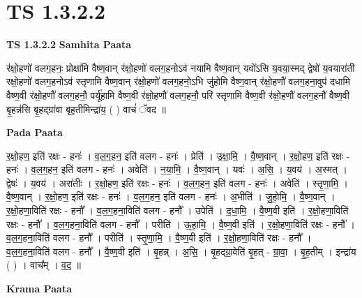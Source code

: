 \documentclass[17pt]{extarticle}
\begin{document}
\section{ TS 1.3.2.2 }

\textbf{TS 1.3.2.2 } \newline
\textbf{Samhita Paata} \newline

र॑क्षो॒हणो॑ वलग॒हनः॒ प्रोक्षा॑मि वैष्ण॒वान् र॑क्षो॒हणो॑ वलग॒हनोऽव॑ नयामि वैष्ण॒वान् यवो॑ऽसि य॒वया॒स्मद् द्वेषो॑ य॒वयारा॑ती रक्षो॒हणो॑ वलग॒हनोऽव॑ स्तृणामि वैष्ण॒वान् र॑क्षो॒हणो॑ वलग॒हनो॒ऽभि जु॑होमि वैष्ण॒वान् र॑क्षो॒हणौ॑ वलग॒हना॒वुप॑ दधामि वैष्ण॒वी र॑क्षो॒हणौ॑ वलग॒हनौ॒ पर्यू॑हामि वैष्ण॒वी र॑क्षो॒हणौ॑ वलग॒हनौ॒ परि॑ स्तृणामि वैष्ण॒वी र॑क्षो॒हणौ॑ वलग॒हनौ॑ वैष्ण॒वी बृ॒हन्न॑सि बृ॒हद्ग्रा॑वा बृह॒तीमिन्द्रा॑य॒ ( ) वाचं॑ ॅवद ॥ \newline

\textbf{Pada Paata} \newline

र॒क्षो॒हण॒ इति॑ रक्षः - हनः॑ । व॒ल॒ग॒हन॒ इति॑ वलग - हनः॑ । प्रेति॑ । उ॒क्षा॒मि॒ । वै॒ष्ण॒वान् । र॒क्षो॒हण॒ इति॑ रक्षः - हनः॑ । व॒ल॒ग॒हन॒ इति॑ वलग - हनः॑ । अवेति॑ । न॒या॒मि॒ । वै॒ष्ण॒वान् । यवः॑ । अ॒सि॒ । य॒वय॑ । अ॒स्मत् । द्वेषः॑ । य॒वय॑ । अरा॑तीः । र॒क्षो॒हण॒ इति॑ रक्षः - हनः॑ । व॒ल॒ग॒हन॒ इति॑ वलग - हनः॑ । अवेति॑ । स्तृ॒णा॒मि॒ । वै॒ष्ण॒वान् । र॒क्षो॒हण॒ इति॑ रक्षः - हनः॑ । व॒ल॒ग॒हन॒ इति॑ वलग - हनः॑ । अ॒भीति॑ । जु॒हो॒मि॒ । वै॒ष्ण॒वान् । र॒क्षो॒हणा॒विति॑ रक्षः - हनौ᳚ । व॒ल॒ग॒हना॒विति॑ वलग - हनौ᳚ । उपेति॑ । द॒धा॒मि॒ । वै॒ष्ण॒वी इति॑ । र॒क्षो॒हणा॒विति॑ रक्षः - हनौ᳚ । व॒ल॒ग॒हना॒विति॑ वलग - हनौ᳚ । परीति॑ । ऊ॒हा॒मि॒ । वै॒ष्ण॒वी इति॑ । र॒क्षो॒हणा॒विति॑ रक्षः - हनौ᳚ । व॒ल॒ग॒हना॒विति॑ वलग - हनौ᳚ । परीति॑ । स्तृ॒णा॒मि॒ । वै॒ष्ण॒वी इति॑ । र॒क्षो॒हणा॒विति॑ रक्षः - हनौ᳚ । व॒ल॒ग॒हना॒विति॑ वलग - हनौ᳚ । वै॒ष्ण॒वी इति॑ । बृ॒हन्न् । अ॒सि॒ । बृ॒हद्ग्रा॒वेति॑ बृ॒हत् - ग्रा॒वा॒ । बृ॒ह॒तीम् । इन्द्रा॑य ( ) । वाच᳚म् । व॒द॒ ॥  \newline


\textbf{Krama Paata} \newline
\end{document}
